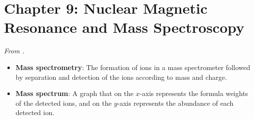 \documentclass[../notes.tex]{subfiles}
\begin{document}
\section{Chapter 9: Nuclear Magnetic Resonance and Mass Spectroscopy}
\emph{From \textcite{bib:SolomonsEtAl}.}
\begin{itemize}
    \item {}\textbf{Mass spectrometry}: The formation of ions in a mass spectrometer followed by separation and detection of the ions according to mass and charge.
    \item \textbf{Mass spectrum}: A graph that on the $x$-axis represents the formula weights of the detected ions, and on the $y$-axis represents the abundance of each detected ion.
    \begin{figure}[h!]
        \centering
\end{figure}
\end{itemize}
\end{document}
